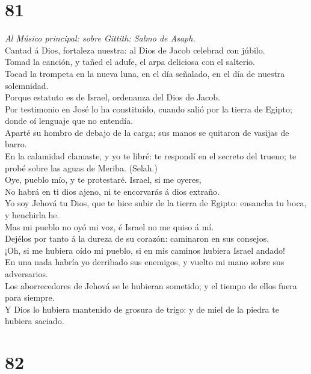 \hypertarget{section-80}{%
\section{81}\label{section-80}}

 \emph{Al Músico principal: sobre Gittith: Salmo de
Asaph.}\\
Cantad á Dios, fortaleza nuestra: al Dios de Jacob celebrad con
júbilo.\\
 Tomad la canción, y tañed el adufe, el arpa deliciosa con
el salterio.\\
 Tocad la trompeta en la nueva luna, en el día señalado, en
el día de nuestra solemnidad.\\
 Porque estatuto es de Israel, ordenanza del Dios de
Jacob.\\
 Por testimonio en José lo ha constituído, cuando salió por
la tierra de Egipto; donde oí lenguaje que no entendía.\\
 Aparté su hombro de debajo de la carga; sus manos se
quitaron de vasijas de barro.\\
 En la calamidad clamaste, y yo te libré: te respondí en el
secreto del trueno; te probé sobre las aguas de Meriba. (Selah.)\\
 Oye, pueblo mío, y te protestaré. Israel, si me oyeres,\\
 No habrá en ti dios ajeno, ni te encorvarás á dios
extraño.\\
 Yo soy Jehová tu Dios, que te hice subir de la tierra de
Egipto: ensancha tu boca, y henchirla he.\\
 Mas mi pueblo no oyó mi voz, é Israel no me quiso á mí.\\
 Dejélos por tanto á la dureza de su corazón: caminaron en
sus consejos.\\
 ¡Oh, si me hubiera oído mi pueblo, si en mis caminos
hubiera Israel andado!\\
 En una nada habría yo derribado sus enemigos, y vuelto mi
mano sobre sus adversarios.\\
 Los aborrecedores de Jehová se le hubieran sometido; y el
tiempo de ellos fuera para siempre.\\
 Y Dios lo hubiera mantenido de grosura de trigo: y de miel
de la piedra te hubiera saciado.

\hypertarget{section-81}{%
\section{82}\label{section-81}}

